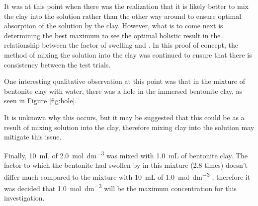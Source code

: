\documentclass[11pt, letterpaper]{article}
\begin{document}
It was at this point when there was the realization that it
is likely better to mix the clay into the solution rather than
the other way around to ensure optimal absorption of the solution
by the clay. However, what is to come next is determining the
best maximum \ce{[H+]} to see the optimal holistic result
in the relationship between the factor of swelling and \ce{[H+]}.
In this proof of concept, the method of mixing the solution
into the clay was continued to ensure that there is consistency
between the test trials.

One interesting qualitative observation at this point was that
in the mixture of bentonite clay with water, there was a hole
in the immersed bentonite clay, as seen in Figure \ref*{fig:hole}.

It is unknown why this occurs, but it may be suggested that
this could be as a result of mixing solution into the clay,
therefore mixing clay into the solution may mitigate this issue.

Finally, \SI{10}{mL} of \SI{2.0}{mol.dm^{-3}} was mixed with \SI{1.0}{mL}
of bentonite clay. The factor to which the bentonite had swollen by
in this mixture (2.8 times) doesn't differ much compared to the
mixture with \SI{10}{mL} of \SI{1.0}{mol.dm^{-3}} , therefore
it was decided that \SI{1.0}{mol.dm^{-3}} will be the maximum
concentration for this investigation.
\end{document}

